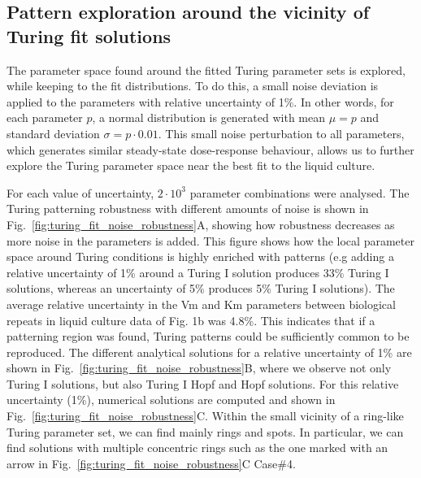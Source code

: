 \subsection{Pattern exploration around the vicinity of Turing fit solutions}
The parameter space found around the fitted Turing parameter sets is explored, while keeping to the fit distributions. To do this, a small noise deviation is applied to the parameters with relative uncertainty of 1\%.
In other words, for each parameter $p$, a normal distribution is generated with mean $\mu=p$ and standard deviation $\sigma=p\cdot 0.01$.
This small noise perturbation to all parameters, which generates similar steady-state dose-response behaviour, allows us to further explore the Turing parameter space near the best fit to the liquid culture.

For each value of uncertainty, $2\cdot10^3$ parameter combinations were analysed.
The Turing patterning robustness with different amounts of noise is shown in Fig.~\ref{fig:turing_fit_noise_robustness}A, showing how robustness decreases as more noise in the parameters is added.
This figure shows how the local parameter space around Turing conditions is highly enriched with patterns (e.g adding a relative uncertainty of 1\% around a Turing I solution produces 33\% Turing I solutions, whereas an uncertainty of 5\% produces 5\% Turing I solutions).
The average relative uncertainty in the Vm and Km parameters between biological repeats in liquid culture data of Fig. 1b was 4.8\%. This indicates that if a patterning region was found, Turing patterns could be sufficiently common to be reproduced. %
The different analytical solutions for a relative uncertainty of 1\% are shown in Fig.~\ref{fig:turing_fit_noise_robustness}B, where we observe not only Turing I solutions, but also Turing I Hopf and Hopf solutions.
For this relative uncertainty (1\%), numerical solutions are computed and shown in Fig.~\ref{fig:turing_fit_noise_robustness}C.
Within the small vicinity of a ring-like Turing parameter set, we can find mainly rings and spots.
In particular, we can find solutions with multiple concentric rings such as the one marked with an arrow in Fig.~\ref{fig:turing_fit_noise_robustness}C Case\#4.


